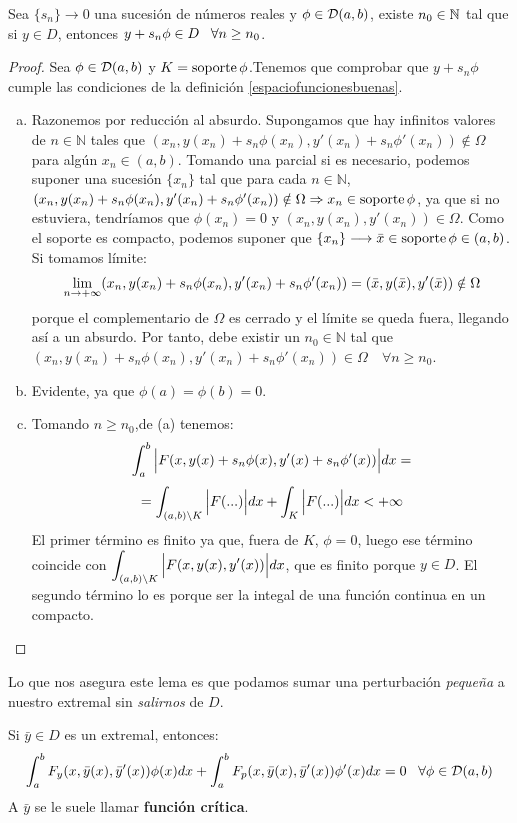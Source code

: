 \begin{lemma}
\label{lemmatecnico}
Sea $\{s_n\}\longrightarrow 0$ una sucesión de números reales y $\phi\in \mathcal{D}(a,b)$, existe $n_0\in\mathbb{N}$ tal que si $y\in D$, entonces $y+s_n\phi\in D \;\;\; \forall n\geq n_0$.
\end{lemma}
\begin{proof}

Sea $\phi\in\mathcal{D}(a,b)$ y $K=\operatorname{soporte}\phi$.Tenemos que comprobar que $y+s_n\phi$ cumple las condiciones de la definición \ref{espaciofuncionesbuenas}.

\begin{enumerate}[(a)]
\item Razonemos por reducción al absurdo. Supongamos que hay infinitos valores de $n\in\mathbb{N}$ tales que $(x_n,y(x_n)+s_n\phi(x_n),y'(x_n)+s_n\phi'(x_n))\notin \Omega$ para algún $x_n\in(a,b)$. Tomando una parcial si es necesario, podemos suponer una sucesión $\{x_n\}$ tal que para cada $n\in\mathbb{N}$, $(x_n,y(x_n)+s_n\phi(x_n),y'(x_n)+s_n\phi'(x_n))\notin \Omega \Rightarrow x_n\in\operatorname{soporte}\phi$, ya que si no estuviera, tendríamos que $\phi(x_n)=0$ y $(x_n,y(x_n),y'(x_n))\in \Omega$. Como el soporte es compacto, podemos suponer que $\{x_n\}\longrightarrow\bar{x}\in\operatorname{soporte}\phi\in(a,b)$. Si tomamos límite:
\[
\displaystyle\lim_{  n  \to +\infty }  (x_n,y(x_n)+s_n\phi(x_n),y'(x_n)+s_n\phi'(x_n)) =(\bar{x},y(\bar{x}),y'(\bar{x}))\notin\Omega 
\]
porque el complementario de $\Omega$ es cerrado y el límite se queda fuera, llegando así a un absurdo. Por tanto, debe existir un $n_0\in\mathbb{N}$ tal que $(x_n,y(x_n)+s_n\phi(x_n),y'(x_n)+s_n\phi'(x_n))\in \Omega\quad\forall n\geq n_0$.
\item Evidente, ya que $\phi(a)=\phi(b)=0$.
\item Tomando $n\geq n_0$,de (a) tenemos:
\[
\displaystyle\int_{ a }^{ b } \Big|F(x,y(x)+s_n\phi(x),y'(x)+s_n\phi'(x))\Big|dx=\]
\[
=\displaystyle\int_{ (a,b)\backslash K }^{  } \Big|F(...)\Big|dx+\displaystyle\int_{ K }^{  } \Big|F(...)\Big|dx < +\infty
\]
El primer término es finito ya que, fuera de $K$, $\phi=0$, luego ese término coincide con $\displaystyle\int_{ (a,b)\backslash K }^{  } \Big|F(x,y(x),y'(x))\Big|dx$, que
es finito porque $y\in D$.
El segundo término lo es porque ser la integal de una función continua en un compacto. 
\end{enumerate}
\end{proof}
Lo que nos asegura este lema es que podamos sumar una perturbación \textit{pequeña} a nuestro extremal sin \textit{salirnos} de $D$.

\begin{theorem}
\label{theorem:1.7}
Si $\bar{y}\in D$ es un extremal, entonces:
\[
\displaystyle\int_{ a }^{ b } F_y(x,\bar{y}(x), \bar{y}'(x))\phi(x)dx+\displaystyle\int_{ a }^{ b } F_p(x,\bar{y}(x), \bar{y}'(x))\phi'(x)dx=0 \;\;\; \forall \phi\in \mathcal{D}(a,b)
\]
A $\bar{y}$ se le suele llamar \textbf{función crítica}.
\end{theorem}

